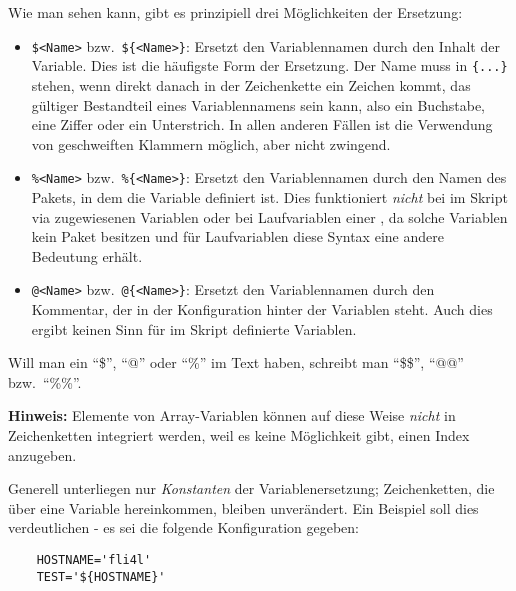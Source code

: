     Wie man sehen kann, gibt es prinzipiell drei Möglichkeiten der Ersetzung:
    \begin{itemize}
    \item \texttt{\$<Name>} bzw.\ \texttt{\$\{<Name>\}}: Ersetzt den
          Variablennamen durch den Inhalt der Variable. Dies ist die häufigste
          Form der Ersetzung. Der Name muss in \texttt{\{...\}} stehen, wenn
          direkt danach in der Zeichenkette ein Zeichen kommt, das gültiger
          Bestandteil eines Variablennamens sein kann, also ein Buchstabe,
          eine Ziffer oder ein Unterstrich. In allen anderen Fällen ist die
          Verwendung von geschweiften Klammern möglich, aber nicht zwingend.

    \item \texttt{\%<Name>} bzw.\ \texttt{\%\{<Name>\}}: Ersetzt den
          Variablennamen durch den Namen des Pakets, in dem die Variable
          definiert ist. Dies funktioniert \emph{nicht} bei im Skript via
           zugewiesenen Variablen oder
          bei Laufvariablen einer ,
          da solche Variablen kein Paket besitzen und für Laufvariablen diese
          Syntax eine andere Bedeutung erhält.

    \item \texttt{@<Name>} bzw.\ \texttt{@\{<Name>\}}: Ersetzt den
          Variablennamen durch den Kommentar, der in der Konfiguration hinter
          der Variablen steht. Auch dies ergibt keinen Sinn für im Skript
          definierte Variablen.
    \end{itemize}

    Will man ein "`\$"', "`@"' oder "`\%"' im Text haben, schreibt man "`\$\$"',
    "`@@"' bzw.\ "`\%\%"'.

    \textbf{Hinweis:} Elemente von Array-Variablen können auf diese Weise
    \emph{nicht} in Zeichenketten integriert werden, weil es keine Möglichkeit
    gibt, einen Index anzugeben.

    Generell unterliegen nur \emph{Konstanten} der Variablenersetzung;
    Zeichenketten, die über eine Variable hereinkommen, bleiben unverändert.
    Ein Beispiel soll dies verdeutlichen - es sei die folgende Konfiguration
    gegeben:

\begin{example}
\begin{verbatim}
    HOSTNAME='fli4l'
    TEST='${HOSTNAME}'
\end{verbatim}
\end{example}


